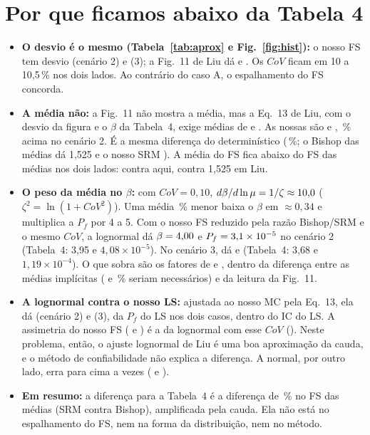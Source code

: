 \documentclass[11pt,a4paper]{article}
\begin{document}
\section{Por que ficamos abaixo da Tabela 4}\label{sec:porque}
\begin{itemize}
  \item \textbf{O desvio é o mesmo (Tabela~\ref{tab:aprox} e Fig.~\ref{fig:hist}):} o nosso FS tem desvio \sdDois{}
    (cenário 2) e \sdTres{} (3); a Fig.~11 de Liu dá \liuSdDois{} e \liuSdTres. Os $CoV$ ficam em 10 a 10,5\,\% nos dois
    lados. Ao contrário do caso A, o espalhamento do FS concorda.
  \item \textbf{A média não:} a Fig.~11 não mostra a média, mas a Eq.~13 de Liu, com o desvio da figura e o $\beta$ da
    Tabela~4, exige médias de \liuMuDois{} e \liuMuTres. As nossas são \muDois{} e \muTres{}, \redLiuMu\,\% acima no
    cenário 2. É a mesma diferença do determinístico (\difDetRel\,\%; o Bishop das médias dá 1,525 e o nosso SRM
    \fsDetTres). A média do FS fica abaixo do FS das médias nos dois lados: \muDois{} contra \fsDetTres{} aqui, \liuMuDois{} contra
    1,525 em Liu.
  \item \textbf{O peso da média no $\beta$:} com $CoV = 0{,}10$, $d\beta/d\ln\mu = 1/\zeta \approx 10{,}0$
    ($\zeta^2 = \ln(1 + CoV^2)$). Uma média \difDetRel\,\% menor baixa o $\beta$ em $\approx 0{,}34$ e multiplica a
    $P_f$ por 4 a 5. Com o nosso FS reduzido pela razão Bishop/SRM e o mesmo $CoV$, a lognormal dá $\beta =
    4{,}00$ e $P_f = 3{,}1\times 10^{-5}$ no cenário 2 (Tabela~4: 3,95 e $4{,}08 \times 10^{-5}$). No cenário 3, dá
    \betaLNredTres{} e \pfLNredTres{} (Tabela~4: 3,68 e $1{,}19 \times 10^{-4}$). O que sobra são os fatores de
    \razaoTabQuatroRedDois{} e \razaoTabQuatroRedTres, dentro da diferença entre as médias implícitas
    (\redReqDois{} e \redReqTres\,\% seriam necessários) e da leitura da Fig.~11.
  \item \textbf{A lognormal contra o nosso LS:} ajustada ao nosso MC pela Eq.~13, ela dá \pfLNDois{} (cenário 2) e
    \pfLNTres{} (3), \razaoLNLSDois{} da $P_f$ do LS nos dois casos, dentro do IC do LS. A assimetria do nosso FS
    (\assimDois{} e \assimTres) é a da lognormal com esse $CoV$ (\assimLN). Neste problema, então, o ajuste lognormal
    de Liu é uma boa aproximação da cauda, e o método de confiabilidade não explica a diferença. A normal, por outro
    lado, erra para cima \razaoNLSTres{} a \razaoNLSDois{} vezes (\pfNDois{} e \pfNTres).
  \item \textbf{Em resumo:} a diferença para a Tabela~4 é a diferença de \difDetRel\,\% no FS das médias (SRM contra
    Bishop), amplificada pela cauda. Ela não está no espalhamento do FS, nem na forma da distribuição, nem no método.
\end{itemize}
\end{document}
